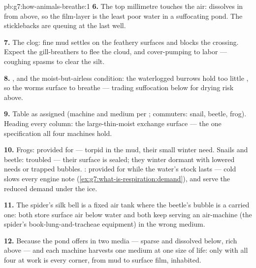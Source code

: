 \begin{solution}{pb:g7:how-animals-breathe:1}
\textbf{6.} The top millimetre touches the air: 
dissolves in from above, so the film-layer is the least
poor water in a suffocating pond. The sticklebacks are
queuing at the last well.

\textbf{7.} The  clog: fine mud settles on the
feathery surfaces and blocks the crossing. Expect the
gill-breathers to flee the cloud, and cover-pumping to
labor --- coughing spasms to clear the silt.

\textbf{8.} , and the moist-but-airless
condition: the waterlogged burrows hold too little ,
so the worms surface to breathe --- trading suffocation
below for drying risk above.

\textbf{9.} Table as assigned (machine and medium per
; commuters: snail, beetle, frog). Heading every
column: the large-thin-moist exchange surface --- the one
specification all four machines hold.

\textbf{10.} Frogs: provided for --- torpid in the mud,
 their small winter need. Snails and beetle:
troubled --- their surface is sealed; they winter dormant
with lowered needs or trapped bubbles. : provided for
while the water's stock lasts --- cold slows every engine
note (\cref{ex:g7:what-is-respiration:demand}), and 
serve the reduced demand under the ice.

\textbf{11.} The spider's silk bell is a fixed air tank
where the beetle's bubble is a carried one: both store
surface air below water and both keep serving an
air-machine (the spider's book-lung-and-tracheae
equipment) in the wrong medium.

\textbf{12.} Because the pond offers  in two media
--- sparse and dissolved below, rich above --- and each
machine harvests one medium at one size of life: only with
all four at work is every corner, from mud to surface
film, inhabited.
\end{solution}

